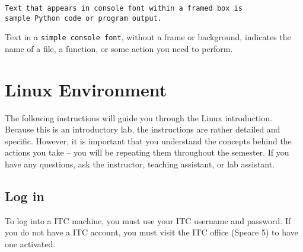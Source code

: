 \documentclass[11pt]{cselabheader}
\begin{document}
\begin{lstlisting}[style=python]
Text that appears in console font within a framed box is 
sample Python code or program output.
\end{lstlisting}

Text in a \texttt{simple console font}, without a frame or background, indicates
the name of a file, a function, or some action you need to perform.



\pagebreak
\section{Linux Environment}
\label{sec:linux}

The following instructions will guide you through the Linux introduction.
Because this is an introductory lab, the instructions are rather detailed and
specific. However, it is important that you understand the concepts behind the
actions you take -- you will be repeating them throughout the semester. If you
have any questions, ask the instructor, teaching assistant, or lab assistant.

\subsection{Log in}
To log into a ITC machine, you must use your ITC username and password. If you
do not have a ITC account, you must visit the ITC office (Speare 5) to have one
activated.
\end{document}
